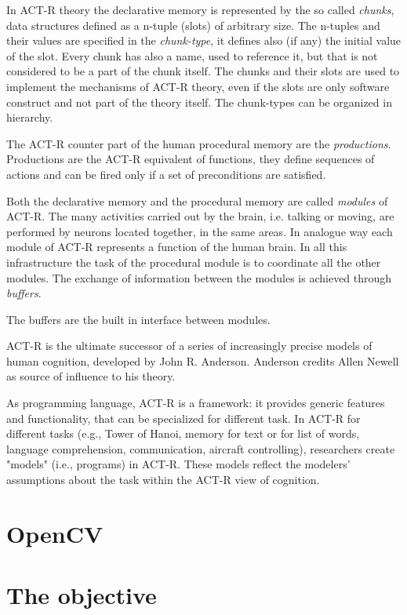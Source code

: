 In ACT-R theory the declarative memory is represented by the so called \emph{chunks}, data structures defined as a n-tuple (slots) of arbitrary size. The n-tuples and their values are specified in the \emph{chunk-type}, it defines also (if any) the initial value of the slot. Every chunk has also a name, used to reference it, but that is not considered to be a part of the chunk itself. The chunks and their slots are used to implement the mechanisms of ACT-R theory, even if the slots are only software construct and not part of the theory itself. The chunk-types can be organized in hierarchy.

The ACT-R counter part of the human procedural memory are the \emph{productions}. Productions are the ACT-R equivalent of functions, they define sequences of actions and can be fired only if a set of preconditions are satisfied. 

Both the declarative memory and the procedural memory are called \emph{modules} of ACT-R.  The many activities carried out by the brain, i.e. talking or moving, are performed by neurons located together, in the same areas. In analogue way each module of ACT-R represents a function of the human brain. In all this infrastructure the task of the procedural module is to coordinate all the other modules. The exchange of information between the modules is achieved through \emph{buffers}.

The buffers are the built in interface between modules.


ACT-R is the ultimate successor of a series of increasingly precise models of human cognition, developed by John R. Anderson. Anderson credits Allen Newell as source of influence to his theory.


As programming language, ACT-R is a framework: it provides generic features and functionality, that can be specialized for different task. In ACT-R for different tasks 
(e.g., Tower of Hanoi, memory for text or for list of words, language comprehension, 
communication, aircraft controlling), researchers create "models" (i.e., programs) in ACT-R. 
These models reflect the modelers' assumptions about the task within the ACT-R view of 
cognition.
\section{OpenCV}
\section{The objective}